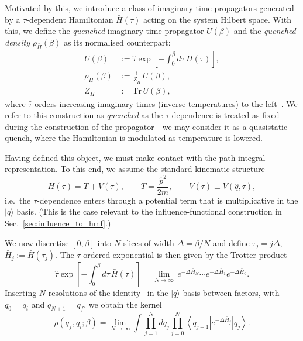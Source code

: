 \documentclass[aps,prl,twocolumn,superscriptaddress,showpacs,floatfix]{revtex4-2}
\newcommand{\Tr}{\mathrm{Tr}}
\begin{document}
Motivated by this, we introduce a class of imaginary-time propagators generated by a $\tau$-dependent Hamiltonian $\bar H(\tau)$ acting on the system Hilbert
space. With this, we define the \emph{quenched} imaginary-time propagator $U(\beta)$ and the \emph{quenched density} $\rho_{\bar H}(\beta)$ as its normalised counterpart:
\begin{equation}
\begin{split}
    U(\beta)
    &:=
    \hat\tau \exp\!\left[-\int_{0}^{\beta} d\tau\,\bar H(\tau)\right],
    \\
    \rho_{\bar H}(\beta)
    &:=
    \frac{1}{Z_{\bar H}}\, U(\beta),
    \\
    Z_{\bar H}&:=\Tr\, U(\beta),
\end{split}
    \label{eq:quenched_canonical_def}
\end{equation}
where $\hat\tau$ orders increasing imaginary times (inverse temperatures) to the left~\cite{feynmanQuantumMechanicsPath1965, kleinertPathIntegralsQuantum2009}. We refer to this construction as \emph{quenched} as the $\tau$-dependence is treated as fixed
during the construction of the propagator - we may consider it as a quasistatic quench, where the Hamiltonian is modulated as temperature is lowered.

Having defined this object, we must make contact with the   path integral representation. To this end, we assume the standard kinematic structure
\begin{equation}
    \bar H(\tau)=\bar T+\bar V(\tau),
    \qquad
    \bar T=\frac{\hat p^2}{2m},
    \qquad
    \bar V(\tau)\equiv \bar V(\hat q,\tau),
    \label{eq:quenched_T_plus_V}
\end{equation}
i.e.\ the $\tau$-dependence enters through a potential term that is multiplicative in the
$|q\rangle$ basis. (This is the case relevant to the influence-functional construction
in Sec.~\ref{sec:influence_to_hmf}.)

We now discretise $[0,\beta]$ into $N$ slices of width $\Delta=\beta/N$ and define
$\tau_j=j\Delta$, $\bar H_j:=\bar H(\tau_j)$. The $\tau$-ordered exponential is then
given by the Trotter product~\cite{kleinertPathIntegralsQuantum2009,schulmanTechniquesApplicationsPath1981}
\begin{equation}
    \hat\tau \exp\!\left[-\int_{0}^{\beta} d\tau\,\bar H(\tau)\right]
    =\lim_{N\to\infty}\, e^{-\Delta \bar H_{N}}\cdots e^{-\Delta \bar H_{1}}e^{-\Delta \bar H_{0}}.
    \label{eq:quenched_timeslice}
\end{equation}
Inserting $N$ resolutions of the identity~\cite{kleinertPathIntegralsQuantum2009} in the $|q\rangle$ basis between factors, with
$q_0=q_i$ and $q_{N+1}=q_f$, we obtain the kernel
\begin{equation}
    \bar\rho(q_f,q_i;\beta)
    =
    \lim_{N\to\infty}
    \int \prod_{j=1}^{N} dq_j
    \prod_{j=0}^{N}
    \left\langle q_{j+1}\right| e^{-\Delta \bar H_j}\left|q_j\right\rangle.
    \label{eq:quenched_kernel_product}
\end{equation}
\end{document}
